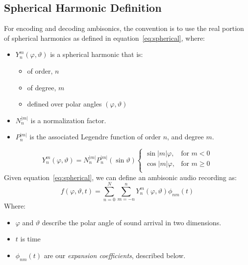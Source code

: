 \subsection{Spherical Harmonic Definition}
For encoding and decoding ambisonics, the convention is to use the
real portion of spherical harmonics as defined in
equation~\ref{eq:spherical}, where:
\begin{itemize}
\item $Y_{n}^{m}(\varphi,\vartheta)$ is a spherical harmonic that
is:
\begin{itemize}
\item of order, $n$
\item of degree, $m$
\item defined over polar angles $(\varphi, \vartheta)$
\end{itemize}
\item $N_n^{|m|}$ is a normalization factor.\cite{Nachbar2011}
\item $P_n^{|m|}$ is the associated Legendre function of order $n$,
  and degree $m$.
\end{itemize}
\begin{equation}
Y_{n}^{m}(\varphi,\vartheta)=N_n^{|m|}P_n^{|m|}(\sin{\vartheta})
\begin{cases}\label{eq:spherical}
\sin{|m|\varphi},&  \text{for $m<0$}\\  
\cos{|m|\varphi},& \text{for $m\geq 0$}\\
\end{cases}
\end{equation}
Given equation~\ref{eq:spherical}, we can define an ambisonic
audio recording as:
\begin{equation}
f(\varphi,\vartheta,t)=\sum\limits_{n=0}^N\sum\limits_{m=-n}^nY_n^m(\varphi,\vartheta)\phi_{nm}(t)
\label{eq:ambisonics}
\end{equation}
Where:
\begin{itemize}
\item $\varphi$ and $\vartheta$ describe the polar angle of sound
  arrival in two dimensions.
\item $t$ is time
\item $\phi_{nm}(t)$ are our \textit{expansion coefficients}, described
  below.
\end{itemize}
